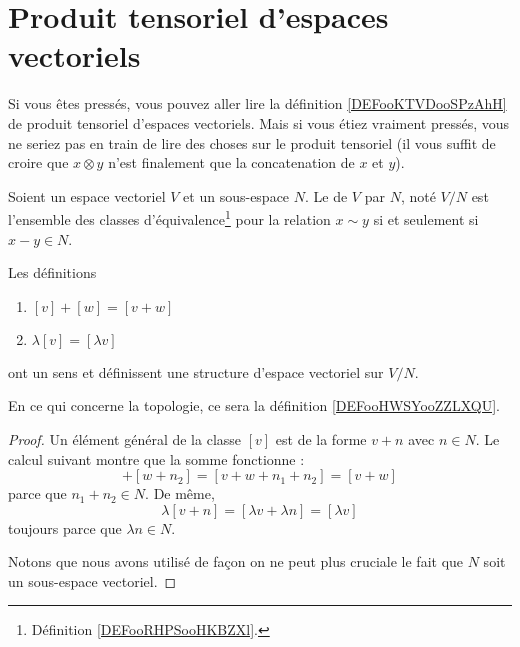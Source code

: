 

\section{Produit tensoriel d'espaces vectoriels}

Si vous êtes pressés, vous pouvez aller lire la définition \ref{DEFooKTVDooSPzAhH} de produit tensoriel d'espaces vectoriels. Mais si vous étiez vraiment pressés, vous ne seriez pas en train de lire des choses sur le produit tensoriel (il vous suffit de croire que \( x\otimes y\) n'est finalement que la concatenation de \( x\) et \( y\)).

\begin{propositionDef}      \label{PROPooYONEooWvwPZT}
	Soient un espace vectoriel \( V\) et un sous-espace \( N\). Le  de \( V\) par \( N\), noté \( V/N\) est l'ensemble des classes d'équivalence\footnote{Définition \ref{DEFooRHPSooHKBZXl}.} pour la relation \( x\sim y\) si et seulement si \( x-y\in N\).

	Les définitions
	\begin{enumerate}
		\item
		      \( [v]+[w]=[v+w]\)
		\item
		      \( \lambda[v]=[\lambda v]\)
	\end{enumerate}
	ont un sens et définissent une structure d'espace vectoriel sur \( V/N\).

	En ce qui concerne la topologie, ce sera la définition \ref{DEFooHWSYooZZLXQU}.
\end{propositionDef}

\begin{proof}
	Un élément général de la classe \( [v]\) est de la forme \( v+n\) avec \( n\in N\). Le calcul suivant montre que la somme fonctionne :
	\begin{equation}
		[v+n_1]+[w+n_2]=[v+w+n_1+n_2]=[v+w]
	\end{equation}
	parce que \( n_1+n_2\in N\). De même,
	\begin{equation}
		\lambda[v+n]=[\lambda v+\lambda n]=[\lambda v]
	\end{equation}
	toujours parce que \( \lambda n\in N\).

	Notons que nous avons utilisé de façon on ne peut plus cruciale le fait que \( N\) soit un sous-espace vectoriel.
\end{proof}

